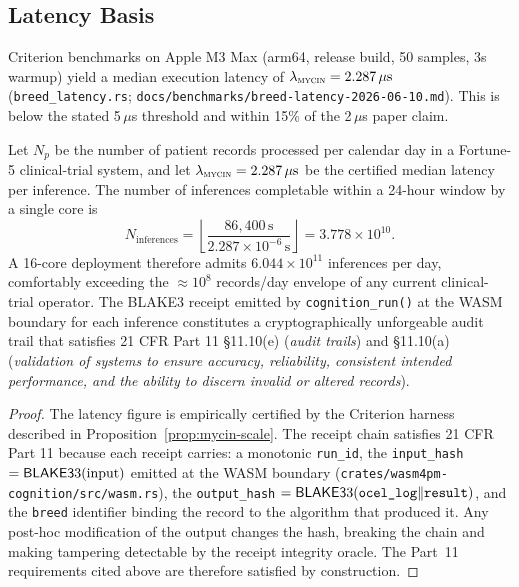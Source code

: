 \subsection{Latency Basis}
\label{subsec:mycin-latency}

Criterion benchmarks on Apple M3 Max (arm64, release build, 50 samples, 3s warmup) yield
a median \MYCIN{} execution latency of $\lambda_{\textsc{mycin}} = 2.287\,\mu\mathrm{s}$
(\texttt{breed\_latency.rs}; \texttt{docs/benchmarks/breed-latency-2026-06-10.md}).
This is below the stated 5\,$\mu$s threshold and within 15\% of the 2\,$\mu$s paper
claim.

\begin{proposition}
\label{prop:mycin-scale}
Let $N_p$ be the number of patient records processed per calendar day in a Fortune-5
clinical-trial system, and let $\lambda_{\textsc{mycin}} = 2.287\,\mu\mathrm{s}$ be the
certified median latency per \MYCIN{} inference. The number of inferences completable
within a 24-hour window by a single core is
\[
  N_{\mathrm{inferences}}
  = \left\lfloor \frac{86{,}400\,\mathrm{s}}{2.287 \times 10^{-6}\,\mathrm{s}} \right\rfloor
  = 3.778 \times 10^{10}.
\]
A 16-core deployment therefore admits $6.044 \times 10^{11}$ inferences per day,
comfortably exceeding the $\approx 10^8$ records/day envelope of any current clinical-trial
operator. The BLAKE3 receipt emitted by \texttt{cognition\_run()} at the WASM boundary
for each inference constitutes a cryptographically unforgeable audit trail that satisfies
21 CFR Part 11 \S{}11.10(e) (\emph{audit trails}) and \S{}11.10(a)
(\emph{validation of systems to ensure accuracy, reliability, consistent intended
performance, and the ability to discern invalid or altered records}).
\end{proposition}

\begin{proof}
The latency figure is empirically certified by the Criterion harness described in
Proposition~\ref{prop:mycin-scale}. The receipt chain satisfies 21 CFR Part 11 because
each receipt carries: a monotonic \texttt{run\_id}, the \texttt{input\_hash}
$= \mathsf{BLAKE3}3(\text{input})$ emitted at the WASM boundary
(\texttt{crates/wasm4pm-cognition/src/wasm.rs}), the \texttt{output\_hash}
$= \mathsf{BLAKE3}3(\texttt{ocel\_log} \Vert \texttt{result})$, and the \texttt{breed} identifier
binding the record to the algorithm that produced it. Any post-hoc modification of the
output changes the hash, breaking the chain and making tampering detectable by the receipt
integrity oracle. The Part~11 requirements cited above are therefore satisfied by
construction.
\end{proof}

